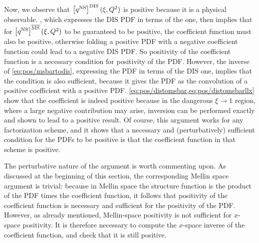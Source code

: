 Now, we observe that
$\left[{q^{{\textrm{NS}}}}\right]^{\textrm{DIS}}(\xi,Q^2)$ is positive because it is a physical
observable. , which expresses the DIS
PDF in terms of the \msbar{} one, then  implies that  for
$\left[{q^{{\textrm{NS}}}}\right]^{{\overline{\textrm{MS}}}}(\xi,Q^2)$  to be guaranteed to be
positive,
the \msbar{} coefficient function  must also be positive, otherwise
folding a positive \msbar{}  PDF with a negative coefficient function
could lead to a negative DIS PDF. So positivity of the \msbar{}
coefficient function
is a necessary condition for positivity of the \msbar{} PDF.
However, the inverse of  \cref{eq:pos/msbartodis}, expressing the
\msbar{} PDF in terms of the DIS one, implies that the condition is
also sufficient, because it gives the \msbar{} PDF as the convolution
of a positive coefficient with a positive PDF. \cref{eq:pos/distomsbar,eq:pos/distomsbarllx} show that the coefficient is indeed
positive because in the dangerous
$\xi\to 1$ region, where  a large negative contribution may arise,
inversion can be performed exactly and shown to lead to a positive
result.
Of
course, this argument works for any factorization scheme, and it shows
that a necessary and (perturbatively) sufficient condition for the
PDFs to be positive is that the coefficient function in that scheme is positive.

The perturbative nature of the argument is worth commenting
upon. As discussed at the beginning of this section, the corresponding
Mellin space argument is trivial: because in Mellin space the
structure function is the product of the PDF times the coefficient
function, it follows that positivity of the coefficient function is
necessary and sufficient for the positivity of the PDF. However, as
already mentioned,
Mellin-space positivity is not sufficient for $x$-space positivity. It
is therefore necessary to compute the $x$-space inverse of the
coefficient function, and check that it is still positive.

